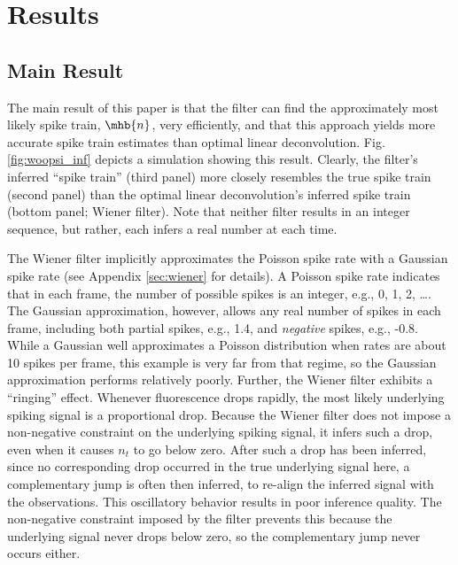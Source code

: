 \section{Results} \label{sec:results}

\subsection{Main Result} \label{sec:main}

The main result of this paper is that the \foopsi filter can find the approximately most likely spike train, $\mhb{n}$, very efficiently, and that this approach yields more accurate spike train estimates than optimal linear deconvolution.  Fig. \ref{fig:woopsi_inf} depicts a simulation showing this result. Clearly, the \foopsi filter's inferred ``spike train'' (third panel) more closely resembles the true spike train (second panel) than the optimal linear deconvolution's inferred spike train (bottom panel; Wiener filter).  Note that neither filter results in an integer sequence, but rather, each infers a real number at each time.

The Wiener filter implicitly approximates the Poisson spike rate with a Gaussian spike rate (see Appendix \ref{sec:wiener} for details).  A Poisson spike rate indicates that in each frame, the number of possible spikes is an integer, e.g., 0, 1, 2, \ldots.  The Gaussian approximation, however, allows any real number of spikes in each frame, including both partial spikes, e.g., 1.4, and \emph{negative} spikes, e.g., -0.8.  While a Gaussian well approximates a Poisson distribution when rates are about 10 spikes per frame, this example is very far from that regime, so the Gaussian approximation performs relatively poorly.  Further, the Wiener filter exhibits a ``ringing'' effect.  Whenever fluorescence drops rapidly, the most likely underlying spiking signal is a proportional drop.  Because the Wiener filter does not impose a non-negative constraint on the underlying spiking signal, it infers such a drop, even when it causes $n_t$ to go below zero.  After such a drop has been inferred, since no corresponding drop occurred in the true underlying signal here, a complementary jump is often then inferred, to re-align the inferred signal with the observations.  This oscillatory behavior results in poor inference quality. The non-negative constraint imposed by the \foopsi filter prevents this because the underlying signal never drops below zero, so the complementary jump never occurs either.

